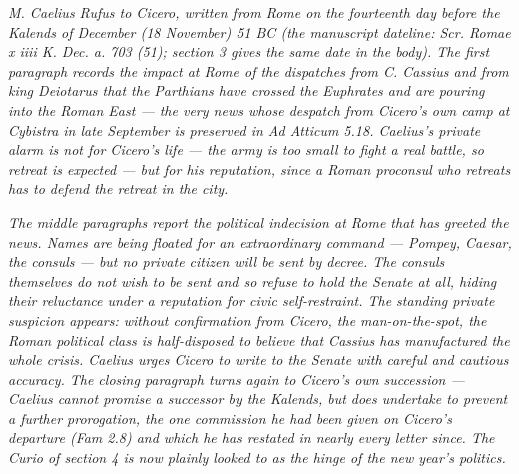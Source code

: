 
\textit{M. Caelius Rufus to Cicero, written from Rome
on the fourteenth day before the Kalends of December
(18 November) 51 BC (the manuscript dateline:
\textit{Scr. Romae x iiii K. Dec. a. 703 (51)}; section 3
gives the same date in the body). The first paragraph
records the impact at Rome of the dispatches from
C. Cassius and from king Deiotarus that the Parthians
have crossed the Euphrates and are pouring into the
Roman East --- the very news whose despatch from
Cicero's own camp at Cybistra in late September is
preserved in \textit{Ad Atticum} 5.18. Caelius's
private alarm is not for Cicero's life --- the army
is too small to fight a real battle, so retreat is
expected --- but for his reputation, since a Roman
proconsul who retreats has to defend the retreat in
the city.}

\textit{The middle paragraphs report the political
indecision at Rome that has greeted the news. Names
are being floated for an extraordinary command ---
Pompey, Caesar, the consuls --- but no private citizen
will be sent by decree. The consuls themselves do not
wish to be sent and so refuse to hold the Senate at all,
hiding their reluctance under a reputation for civic
self-restraint. The standing private suspicion appears:
without confirmation from Cicero, the man-on-the-spot,
the Roman political class is half-disposed to believe
that Cassius has manufactured the whole crisis. Caelius
urges Cicero to write to the Senate with careful and
cautious accuracy. The closing paragraph turns again
to Cicero's own succession --- Caelius cannot promise a
successor by the Kalends, but does undertake to prevent
a further prorogation, the one commission he had been
given on Cicero's departure (\textit{Fam} 2.8) and
which he has restated in nearly every letter since.
The Curio of section 4 is now plainly looked to as the
hinge of the new year's politics.}
